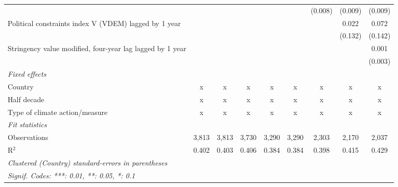 \begin{tabular}{lcccccccc}
                                                             &               &               &               &               &               & (0.008)       & (0.009)      & (0.009)\\   
   Political constraints index V (VDEM) lagged by 1 year     &               &               &               &               &               &               & 0.022        & 0.072\\   
                                                             &               &               &               &               &               &               & (0.132)      & (0.142)\\   
   Stringency value modified, four-year lag lagged by 1 year &               &               &               &               &               &               &              & 0.001\\   
                                                             &               &               &               &               &               &               &              & (0.003)\\   
   \emph{Fixed effects}\\
   Country                                                   & x             & x             & x             & x             & x             & x             & x            & x\\  
   Half decade                                               & x             & x             & x             & x             & x             & x             & x            & x\\  
   Type of climate action/measure                            & x             & x             & x             & x             & x             & x             & x            & x\\  
   \midrule \emph{Fit statistics}\\
   Observations                                              & 3,813         & 3,813         & 3,730         & 3,290         & 3,290         & 2,303         & 2,170        & 2,037\\  
   R$^2$                                                     & 0.402         & 0.403         & 0.406         & 0.384         & 0.384         & 0.398         & 0.415        & 0.429\\  
   \midrule
   \multicolumn{9}{l}{\emph{Clustered (Country) standard-errors in parentheses}}\\
   \multicolumn{9}{l}{\emph{Signif. Codes: ***: 0.01, **: 0.05, *: 0.1}}\\
\end{tabular}
\par\endgroup


